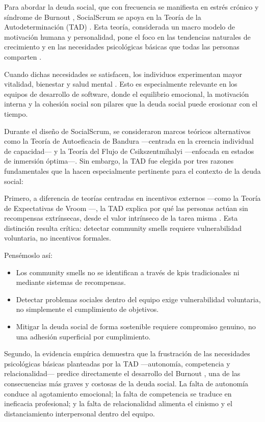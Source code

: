 Para abordar la deuda social, que con frecuencia se manifiesta en estrés crónico y síndrome de Burnout \cite{wilson_all_2006,tulili2022burnout}, SocialScrum se apoya en la Teoría de la Autodeterminación (TAD) \cite{ryan_self-determination_2000}.
Esta teoría, considerada un macro modelo de motivación humana y personalidad, pone el foco en las tendencias naturales de crecimiento y en las necesidades psicológicas básicas que todas las personas comparten \cite{ryan_self-determination_2000}.

Cuando dichas necesidades se satisfacen, los individuos experimentan mayor vitalidad, bienestar y salud mental \cite{ryan_self-determination_2000}.
Esto es especialmente relevante en los equipos de desarrollo de software, donde el equilibrio emocional, la motivación interna y la cohesión social son pilares que la deuda social puede erosionar con el tiempo.

Durante el diseño de SocialScrum, se consideraron marcos teóricos alternativos como la Teoría de Autoeficacia de Bandura \cite{bandura1997self} —centrada en la creencia individual de capacidad— y la Teoría del Flujo de Csikszentmihalyi \cite{csikszentmihalyi1990flow} —enfocada en estados de inmersión óptima—. Sin embargo, la TAD fue elegida por tres razones fundamentales que la hacen especialmente pertinente para el contexto de la deuda social:

Primero, a diferencia de teorías centradas en incentivos externos —como la Teoría de Expectativas de Vroom \cite{vroom1964work}—, la TAD explica por qué las personas actúan sin recompensas extrínsecas, desde el valor intrínseco de la tarea misma \cite{ryan_self-determination_2000}. Esta distinción resulta crítica: detectar community smells requiere vulnerabilidad voluntaria, no incentivos formales.

Pensémoslo así:

\begin{itemize}
    \item Los community smells no se identifican a través de \acrfull{kpis} tradicionales ni mediante sistemas de recompensas.
    \item Detectar problemas sociales dentro del equipo exige vulnerabilidad voluntaria, no simplemente el cumplimiento de objetivos.
    \item Mitigar la deuda social de forma sostenible requiere compromiso genuino, no una adhesión superficial por cumplimiento.
\end{itemize}

Segundo, la evidencia empírica demuestra que la frustración de las necesidades psicológicas básicas planteadas por la TAD —autonomía, competencia y relacionalidad— predice directamente el desarrollo del Burnout \cite{tulili2022burnout}, una de las consecuencias más graves y costosas de la deuda social. La falta de autonomía conduce al agotamiento emocional; la falta de competencia se traduce en ineficacia profesional; y la falta de relacionalidad alimenta el cinismo y el distanciamiento interpersonal dentro del equipo.

